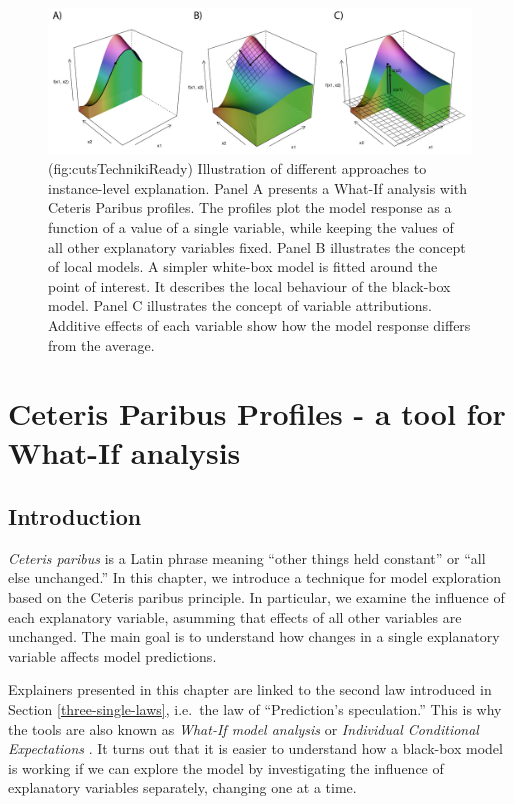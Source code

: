 \documentclass[12pt,]{krantz}
\theoremstyle{definition}
\theoremstyle{definition}
\theoremstyle{definition}
\theoremstyle{remark}
\begin{document}
\begin{figure}

{\centering \includegraphics[width=0.99\linewidth]{figure/cuts_techniki_ready} 

}

\caption{(fig:cutsTechnikiReady) Illustration of different approaches to instance-level explanation. Panel A presents a What-If analysis with Ceteris Paribus profiles. The profiles plot the model response as a function of a value of a single variable, while keeping the values of all other explanatory variables fixed. Panel B illustrates the concept of local models. A simpler white-box model is fitted around the point of interest. It describes the local behaviour of the black-box model. Panel C illustrates the concept of variable attributions. Additive effects of each variable show how the model response differs from the average.}\label{fig:cutsTechnikiReady}
\end{figure}

\hypertarget{ceterisParibus}{%
\section{Ceteris Paribus Profiles - a tool for What-If
analysis}\label{ceterisParibus}}

\hypertarget{introduction-1}{%
\subsection{Introduction}\label{introduction-1}}

\emph{Ceteris paribus} is a Latin phrase meaning ``other things held
constant'' or ``all else unchanged.'' In this chapter, we introduce a
technique for model exploration based on the Ceteris paribus principle.
In particular, we examine the influence of each explanatory variable,
asumming that effects of all other variables are unchanged. The main
goal is to understand how changes in a single explanatory variable
affects model predictions.

Explainers presented in this chapter are linked to the second law
introduced in Section \ref{three-single-laws}, i.e.~the law of
``Prediction's speculation.'' This is why the tools are also known as
\emph{What-If model analysis} or \emph{Individual Conditional
Expectations} \citep{ICEbox}. It turns out that it is easier to
understand how a black-box model is working if we can explore the model
by investigating the influence of explanatory variables separately,
changing one at a time.
\end{document}

